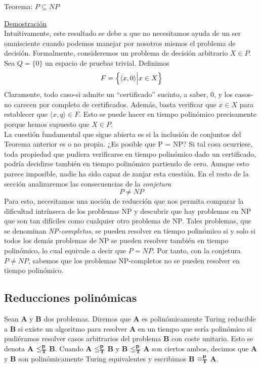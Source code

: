 \begin{fondo}
Teorema: $P \subseteq NP$
\end{fondo}

\underline{Demostración}\\
Intuitivamente, este resultado se debe a que no necesitamos ayuda de un ser omnisciente cuando podemos manejar por nosotros mismos el problema de decisión. Formalmente, consideremos un problema de decisión arbitrario $X \in P$. Sea $Q = \{0\}$ un espacio de pruebas trivial. Definimos
\[ F = \Bigl\{ \langle x, 0 \rangle \Bigl| x \in X \Bigl\} \]
Claramente, todo caso-si admite un ``certificado'' sucinto, a saber, 0, y los casos-no carecen por completo de certificados. Además, basta verificar que $x \in X$ para establecer que $\langle x, q \rangle \in F$. Esto se puede hacer en tiempo polinómico precisamente porque hemos supuesto que $X \in P$.\\
La cuestión fundamental que sigue abierta es si la inclusión de conjuntos del Teorema anterior es o no propia. ¿Es posible que P = NP? Si tal cosa ocurriese, toda propiedad que pudiera verificarse en tiempo polinómico dado un certificado,  podría decidirse también en tiempo polinómico partiendo de cero. Aunque esto parece imposible, nadie ha sido capaz de zanjar esta cuestión. En el resto de la sección analizaremos las consecuencias de la \emph{conjetura}
\[ P \neq NP \]
Para esto, necesitamos una noción de reducción que nos permita comparar la dificultad intrínseca de los problemas NP y descubrir que hay problemas en NP que son tan difíciles como cualquier otro problema de NP. Tales problemas, que se denominan \emph{NP-completos}, se pueden resolver en tiempo polinómico si y solo si todos los demás problemas de NP se pueden resolver también en tiempo polinómico, lo cual equivale a decir que $P = NP$. Por tanto, con la conjetura $P \neq NP$, sabemos que los problemas NP-completos no se pueden resolver en tiempo polinómico.\\

\subsection{Reducciones polinómicas}

\begin{fondo}
Sean \textbf{A} y \textbf{B} dos problemas. Diremos que \textbf{A} es polinómicamente Turing reducible a \textbf{B} si existe un algoritmo para resolver \textbf{A} en un tiempo que sería polinómico si pudiéramos resolver casos arbitrarios del problema \textbf{B} con coste unitario. Esto se denota \textbf{A} $\bf{\leq} _{T}^p$ \textbf{B}. Cuando \textbf{A} $\bf{\leq} _{T}^p$ \textbf{B} y \textbf{B} $\bf{\leq} _{T}^p$ \textbf{A} son ciertos ambos, decimos que \textbf{A} y \textbf{B} son polinómicamente Turing equivalentes y escribimos \textbf{B} $\bf{\equiv} _{T}^p$ \textbf{A}.
\end{fondo}

